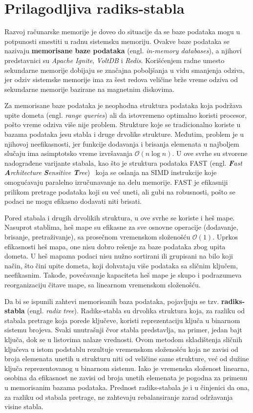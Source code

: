 \documentclass[12pt,oneside]{memoir}
\begin{document}
\chapter{Prilagodljiva radiks-stabla}

Razvoj računarske memorije je doveo do situacije da se baze podataka
mogu u potpunosti smestiti u radnu sistemsku memoriju. Ovakve baze podataka se nazivaju
\textbf{memorisane baze podataka} (engl. \emph{in-memory databases}), a njihovi predstavnici su
\emph{Apache Ignite}, \emph{VoltDB} i \emph{Redis}. Korišćenjem radne umesto sekundarne
memorije dobijaju se značajna poboljšanja u vidu smanjenja odziva, jer odziv sistemske memorije
ima za šest redova veličine brže vreme odziva od sekundarne memorije bazirane na magnetnim diskovima.

Za memorisane baze podataka je neophodna struktura podataka koja podržava upite dometa
(engl. \emph{range queries}) ali da istovremeno optimalno koristi procesor, pošto
vreme odziva više nije problem. Strukture koje se tradicionalno koriste u bazama podataka jesu
stabla i druge drvolike strukture. Međutim, problem je u njihovoj neefikasnosti, jer
funkcije dodavanja i brisanja elemenata u najboljem slučaju ima asimptotsko vreme izvršavanja
$ \mathcal{O}(n\log{}n) $. U ove svrhe su stvorene nadograđene varijante stabala,
kao što je struktura podataka FAST
(engl. \emph{\textbf{F}ast \textbf{A}rchitecture \textbf{S}ensitive \textbf{T}ree})~\cite{fast}
koja se oslanja na SIMD instrukcije koje omogućavaju paralelno izručunavanje na delu memorije.
FAST je efikasniji prilikom pretrage podataka koji su već uneti,
ali gubi na robusnosti, pošto se podaci ne mogu efikasno dodavati niti brisati.

Pored stabala i drugih drvolikih struktura, u ove svrhe se koriste i heš mape. Nasuprot
stablima, heš mape su efikasne za sve osnovne operacije (dodavanje, brisanje, pretraživanje),
sa prosečnom vremenskom složenošću $ \mathcal{O}(1) $. Uprkos efikasnosti heš mapa, one nisu
dobro rešenje za baze podataka zbog upita dometa. U heš mapama podaci nisu nužno sortirani ili
grupisani na bilo koji način, što čini upite dometa, koji dohvataju više podataka
sa sličnim ključem, neefikasnim.
Takođe, povećavanje kapaciteta heš mape je skupo i podrazumeva reorganizaciju
čitave mape, sa linearnom vremenskom složenošću.

Da bi se ispunili zahtevi memorisanih baza podataka, pojavljuju se tzv.
\textbf{radiks-stabla} (engl. \emph{radix tree}). Radiks-stabla su drvolika struktura koja,
za razliku od stabala pretrage koja porede ključeve, koristi reprezentaciju ključa u
binarnom sistemu brojeva. Svaki unutrašnji čvor stabla predstavlja, na primer,
jedan bajt ključa,
dok se u listovima nalaze vrednosti. Ovom metodom skladištenja sličnih ključeva u
istom podstablu rezultuje vremenskom složenošću koja ne zavisi od broja elemenata
unetih u strukturu niti od veličine same strukture, već od
dužine ključa reprezentovanog u binarnom sistemu. Iako je vremenska složenost linearna,
osobina da efikasnost ne zavisi od broja unetih elemenata je pogodna za primenu
u memorisanim bazama podataka. Prednost radiks-stabala je i u činjenici da ona,
za razliku od stabala pretrage, ne zahtevaju rebalansiranje zarad
održavanja visine stabla.
\end{document}
